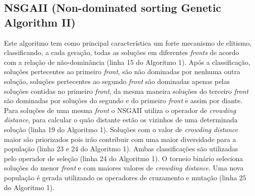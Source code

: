 \documentclass[conference]{IEEEtran}
\begin{document}
\subsection{NSGAII (Non-dominated sorting Genetic Algorithm II)}
Este algoritmo tem como principal característica um forte mecanismo de elitismo, classificando, a cada geração, todas as soluções em diferentes \textit{fronts} de acordo com a relação de não-dominância (linha 15 do Algoritmo 1). Após a classificação, soluções pertecentes ao primeiro \textit{front}, são não dominadas por nenhuma outra solução, soluções pertecentes ao segundo \textit{front} são dominadas apenas pelas soluções contidas no primeiro \textit{front}, da mesma maneira soluções do terceiro \textit{front} são dominadas por soluções do segundo e do primeiro \textit{front} e assim por diante. Para soluções de uma mesma \textit{front} o NSGAII utiliza o operador de \textit{crowding distance}, para calcular o quão distante estão os vizinhos de uma determinada solução (linha 19 do Algoritmo 1). Soluções com o valor de \textit{crowding distance} maior são priorizados pois irão contribuir com uma maior diversidade para a população (linha 23 e 24 do Algoritmo 1). Ambas classificações são utilizadas pelo operador de seleção (linha 24 do Algoritmo 1). O torneio binário seleciona soluções do menor \textit{front} e com maiores valores de \textit{crowding distance}. Uma nova população é gerada utilizando os operadores de cruzamento e mutação (linha 25 do Algoritmo 1).
\end{document}
